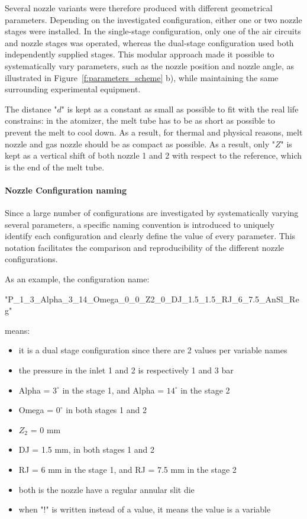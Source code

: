 \documentclass[../../main.tex]{subfiles}
\begin{document}
Several nozzle variants were therefore produced with different geometrical parameters. Depending on the investigated configuration, either one or two nozzle stages were installed. In the single-stage configuration, only one of the air circuits and nozzle stages was operated, whereas the dual-stage configuration used both independently supplied stages. This modular approach made it possible to systematically vary parameters, such as the nozzle position and nozzle angle, as illustrated in Figure~\ref{f:parameters_scheme} b), while maintaining the same surrounding experimental equipment. 

The distance "$d$" is kept as a constant as small as possible to fit with the real life constrains: in the atomizer, the melt tube has to be as short as possible to prevent the melt to cool down. As a result, for thermal and physical reasons, melt nozzle and gas nozzle should be as compact as possible. As a result, only "$Z$" is kept as a vertical shift of both nozzle 1 and 2 with respect to the reference, which is the end of the melt tube.

\paragraph{Nozzle Configuration naming}

Since a large number of configurations are investigated by systematically varying several parameters, a specific naming convention is introduced to uniquely identify each configuration and clearly define the value of every parameter. This notation facilitates the comparison and reproducibility of the different nozzle configurations.

As an example, the configuration name:
\begin{center}{"P\_1\_3\_Alpha\_3\_14\_Omega\_0\_0\_Z2\_0\_DJ\_1.5\_1.5\_RJ\_6\_7.5\_AnSl\_Reg"}
\end{center}

means:

\begin{itemize}
    \item it is a dual stage configuration since there are 2 values per variable names
    \item the pressure in the inlet 1 and 2 is respectively 1 and 3 bar
    \item Alpha = $3^\circ$ in the stage 1, and Alpha = $14^\circ$ in the stage 2
    \item Omega = $0^\circ$ in both stages 1 and 2
    \item $Z_2$ = 0 mm
    \item DJ = 1.5 mm, in both stages 1 and 2
    \item RJ = 6 mm in the stage 1, and RJ = 7.5 mm in the stage 2
    \item both is the nozzle have a regular annular slit die
    \item when "!" is written instead of a value, it means the value is a variable
\end{itemize}
\end{document}
